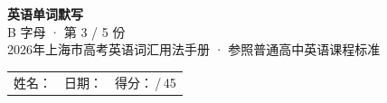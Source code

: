 \documentclass[10pt,a4paper]{article}
\begin{document}
\pagestyle{plain}

\begin{center}
{\LARGE\bfseries 英语单词默写}\\[0.22em]
{\large B 字母 · 第 3 / 5 份}\\[0.18em]
{\small 2026年上海市高考英语词汇用法手册 · 参照普通高中英语课程标准}
\end{center}

\vspace{0.25em}
\noindent\begin{tabular}{@{}p{}@{}p{}@{}p{}@{}}
姓名：\underline{\hspace{2.0cm}} & 日期：\underline{\hspace{2.0cm}} & 得分：\underline{\hspace{1.3cm}}\,/\,45 \\
\end{tabular}

\vspace{0.3em}

\vspace{0.08em}
\end{document}
